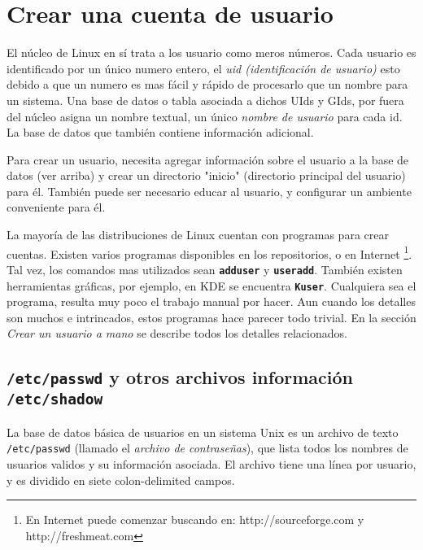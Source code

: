 \documentclass[12pt]{article}
\begin{document}
\section{ Crear una cuenta de usuario}

El núcleo de Linux en sí trata a los usuario como meros números. Cada
usuario es identificado por un único numero entero, el  \textit{uid
(identificación de usuario)} esto debido a que un numero es mas fácil
y rápido de procesarlo que un nombre para un sistema. Una base de datos o tabla
asociada a dichos UIds y GIds, por fuera del núcleo asigna un nombre textual, un
único \textit{nombre de usuario} para cada id. La base de datos
que también contiene información adicional. 

Para crear un usuario, necesita agregar información sobre el usuario a la
base de datos (ver arriba) y crear un directorio "inicio" (directorio principal
del usuario) para él. También puede ser necesario educar al usuario, y
configurar un ambiente conveniente para él.

La mayoría de las distribuciones de Linux cuentan con programas para crear
cuentas. Existen varios programas disponibles en los repositorios,
o en Internet
	\footnote{En Internet puede comenzar buscando en:
	http://sourceforge.com y http://freshmeat.com}. Tal vez,
los comandos mas utilizados sean \texttt{\textbf{adduser}} y
\texttt{\textbf{useradd}}. También existen herramientas gráficas, por ejemplo,
en KDE se encuentra \texttt{\textbf{Kuser}}.
Cualquiera sea 
el programa, resulta muy poco el trabajo manual por hacer. Aun
cuando los detalles son muchos e intrincados, estos programas hace parecer todo
trivial. En la sección \textit{Crear un usuario a mano} se describe
todos los detalles relacionados.





\subsection{ \texttt{/etc/passwd} y otros archivos información \texttt{/etc/shadow}}

La base de datos básica de usuarios en un sistema Unix es un archivo de
texto  \texttt{/etc/passwd} (llamado el \textit{archivo de
contraseñas}), que lista todos los nombres de usuarios validos y su
información asociada. El archivo tiene una línea por usuario, y es dividido en
siete colon-delimited campos.
\end{document}
